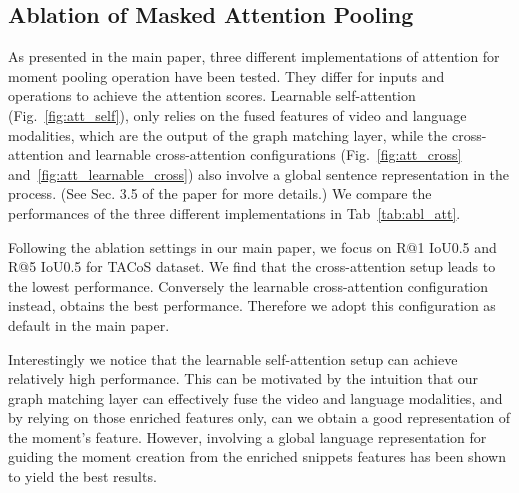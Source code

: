 \documentclass[10pt,twocolumn,letterpaper]{article}
\begin{document}
\subsection*{Ablation of Masked Attention Pooling}
As presented in the main paper, three different implementations of attention for moment pooling operation have been tested. They differ for inputs and operations to achieve the attention scores. Learnable self-attention (Fig.~\ref{fig:att_self}), only relies on the fused features of video and language modalities, which are the output of the graph matching layer, while the cross-attention and learnable cross-attention configurations (Fig.~\ref{fig:att_cross} and~\ref{fig:att_learnable_cross}) also involve a global sentence representation  in the process. (See Sec. 3.5 of the paper for more details.) 
We compare the performances of the three different implementations in Tab~\ref{tab:abl_att}.


Following the ablation settings in our main paper, we focus on R@1 IoU0.5 and R@5 IoU0.5 for TACoS dataset.
We find that the cross-attention setup leads to the lowest performance. Conversely the learnable cross-attention configuration instead, obtains the best performance. Therefore we adopt this configuration as default in the main paper. 


Interestingly we notice that the learnable self-attention setup can achieve relatively high performance. This can be motivated by the intuition that our graph matching layer can effectively fuse the video and language modalities, and by relying on those enriched features only, can we obtain a good representation of the moment's feature. However, involving a global language representation for guiding the moment creation from the enriched snippets features has been shown to yield the best results. 

\begin{table}[!t]
    \centering \setlength{\tabcolsep}{3pt}
\renewcommand{\arraystretch}{1.1} 
\vspace{.1cm}
\caption{\label{tab:abl_att}{\bf Ablation of masked attention pooling implementations.} The experimental results show that the cross-attention setup leads to sub-optimal performance. Instead, the learnable cross-attention configuration obtains the best performance.} \end{table}
\end{document}
